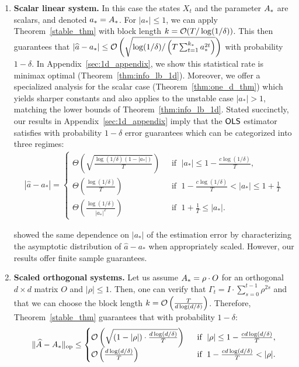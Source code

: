 \begin{enumerate}
\item \textbf{Scalar linear system.} In this case the states $X_t$ and the parameter $A_{*}$ are scalars, and denoted $a_* = A_{*}$. For $|a_*| \le 1$, we can apply Theorem~\ref{stable_thm} with block length $k = \operatorname{\mathcal{O}}(T/\log(1/\delta))$. This then guarantees that $|\widehat{a} - a_*| \leq \operatorname{\mathcal{O}}\left(\sqrt{\log(1/\delta)/\left(T \sum_{t = 1}^{k_*} a_*^{2t} \right)}\right)$ with probability $1 - \delta$. In Appendix~\ref{sec:1d_appendix}, we show this statistical rate is minimax optimal (Theorem~\ref{thm:info_lb_1d}). Moreover, we offer a specialized analysis for the scalar case (Theorem~\ref{thm:one_d_thm}) which yields sharper constants and also applies to the unstable case $|a_*| > 1$, matching the lower bounds of Theorem~\ref{thm:info_lb_1d}. Stated succinctly, our results in Appendix~\ref{sec:1d_appendix} imply that the $\mathsf{OLS }$ estimator satisfies with probability $1 - \delta$ error guarantees which can be categorized into three regimes:
\begin{align*}
    |\widehat{a} - a_*| = \begin{cases}
        \Theta\left(\sqrt{\frac{\log(1/\delta)(1 - |a_*|)}{T}}\right)\; &\text{ if }\; |a_*| \leq 1 - \frac{c\log(1/\delta)}{T},\\
        \Theta\left(\frac{\log(1/\delta)}{T}\right)\; &\text{ if }\; 1 - \frac{c\log(1/\delta)}{T} < |a_*| \leq 1 + \frac{1}{T}\\
        \Theta\left(\frac{\log\left(1/\delta\right)}{|a_*|^T}\right) \; &\text{ if }\; 1 + \frac{1}{T} \le |a_*|.
    \end{cases}
\end{align*}

\citet{white1958limiting} showed the same dependence on $|a_*|$ of the estimation error by characterizing the asymptotic distribution of $\widehat{a} - a_*$ when appropriately scaled. However, our results offer finite sample guarantees. 


\item \textbf{Scaled orthogonal systems.} Let us assume $A_{*} =  \rho \cdot O$ for an orthogonal $d\times d$ matrix $O$ and $|\rho| \leq 1$. Then, one can verify that $\Gamma_t = I \cdot \sum_{s=0}^{t-1} \rho^{2s}$ and that we can choose the block length $k = \operatorname{\mathcal{O}}\left(\tfrac{T}{d\log(d/\delta)}\right)$. Therefore, Theorem~\ref{stable_thm} guarantees that with probability $1 - \delta$:
\begin{align}\label{eq:rho_eye_upper}
\lVert \widehat{A} - A_{*} \rVert_{\mathrm{op}} \leq \begin{cases}
    \operatorname{\mathcal{O}}\left(\sqrt{(1-|\rho|) \cdot \frac{d\log(d/\delta)}{T}}\right)\; &\text{ if }\; |\rho| \leq 1 - \frac{cd\log(d/\delta)}{T},\\
    \operatorname{\mathcal{O}}\left(\frac{d\log(d/\delta)}{T}\right)\; &\text{ if }\; 1 - \frac{cd\log(d/\delta)}{T} < |\rho|.
\end{cases}
\end{align}


\end{enumerate}
